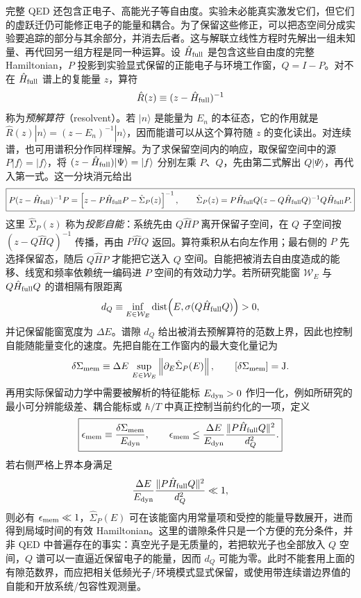 完整 QED 还包含正电子、高能光子等自由度。实验未必能真实激发它们，但它们的虚跃迁仍可能修正电子的能量和耦合。为了保留这些修正，可以把态空间分成实验要追踪的部分与其余部分，并消去后者。这与解联立线性方程时先解出一组未知量、再代回另一组方程是同一种运算。设 $\hat H_{\rm full}$ 是包含这些自由度的完整 Hamiltonian，$P$ 投影到实验显式保留的正能电子与环境工作窗，$Q=I-P$。对不在 $\hat H_{\rm full}$ 谱上的复能量 $z$，算符
\[
\hat R(z)\equiv(z-\hat H_{\rm full})^{-1}
\]
称为\emph{预解算符}（resolvent）。若 $|n\rangle$ 是能量为 $E_n$ 的本征态，它的作用就是 $\hat R(z)|n\rangle=(z-E_n)^{-1}|n\rangle$，因而能谱可以从这个算符随 $z$ 的变化读出。对连续谱，也可用谱积分作同样理解。为了求保留空间内的响应，取保留空间中的源 $P|f\rangle=|f\rangle$，将 $(z-\hat H_{\rm full})|\Psi\rangle=|f\rangle$ 分别左乘 $P$、$Q$，先由第二式解出 $Q|\Psi\rangle$，再代入第一式。这一分块消元给出
\begin{equation}
\boxed{
P(z-\hat H_{\rm full})^{-1}P
=
\left[
z-P\hat H_{\rm full}P-\hat\Sigma_P(z)
\right]^{-1},
\qquad
\hat\Sigma_P(z)
=P\hat H_{\rm full}Q
(z-Q\hat H_{\rm full}Q)^{-1}
Q\hat H_{\rm full}P .}
\label{eq:free_electron_feshbach_resolvent_mother}
\end{equation}
这里 $\hat\Sigma_P(z)$ 称为\emph{投影自能}：系统先由 $Q\hat H P$ 离开保留子空间，在 $Q$ 子空间按 $(z-Q\hat H Q)^{-1}$ 传播，再由 $P\hat H Q$ 返回。算符乘积从右向左作用；最右侧的 $P$ 先选择保留态，随后 $Q\hat H P$ 才能把它送入 $Q$ 空间。自能把被消去自由度造成的能移、线宽和频率依赖统一编码进 $P$ 空间的有效动力学。若所研究能窗 $\mathcal W_E$ 与 $Q\hat H_{\rm full}Q$ 的谱相隔有限距离
\[
d_Q
\equiv
\inf_{E\in\mathcal W_E}
\operatorname{dist}
\!\left(E,\sigma(Q\hat H_{\rm full}Q)\right)>0,
\]
并记保留能窗宽度为 $\Delta E$。谱隙 $d_Q$ 给出被消去预解算符的范数上界，因此也控制自能随能量变化的速度。先把自能在工作窗内的最大变化量记为
\begin{equation*}
\delta\Sigma_{\rm mem}
\equiv
\Delta E\,
\sup_{E\in\mathcal W_E}
\left\|
\partial_E\hat\Sigma_P(E)
\right\|,
\qquad
[\delta\Sigma_{\rm mem}]={\rm J}.
\end{equation*}
再用实际保留动力学中需要被解析的特征能标 $E_{\rm dyn}>0$ 作归一化，例如所研究的最小可分辨能级差、耦合能标或 $\hbar/T$ 中真正控制当前约化的一项，定义
\begin{equation}
\boxed{
\epsilon_{\rm mem}
\equiv
\frac{\delta\Sigma_{\rm mem}}{E_{\rm dyn}},
\qquad
\epsilon_{\rm mem}
\le
\frac{\Delta E}{E_{\rm dyn}}
\frac{\|P\hat H_{\rm full}Q\|^2}{d_Q^2}.}
\label{eq:free_electron_effective_memory_control}
\end{equation}
若右侧严格上界本身满足
\begin{equation*}
\frac{\Delta E}{E_{\rm dyn}}
\frac{\|P\hat H_{\rm full}Q\|^2}{d_Q^2}\ll1,
\end{equation*}
则必有 $\epsilon_{\rm mem}\ll1$，$\hat\Sigma_P(E)$ 可在该能窗内用常量项和受控的能量导数展开，进而得到局域时间的有效 Hamiltonian。这里的谱隙条件只是一个方便的充分条件，并非 QED 中普遍存在的事实：真空光子是无质量的，若把软光子也全部放入 $Q$ 空间，$Q$ 谱可以一直逼近保留电子的能量，因而 $d_Q$ 可能为零。此时不能套用上面的有隙范数界，而应把相关低频光子/环境模式显式保留，或使用带连续谱边界值的自能和开放系统/包容性观测量。


